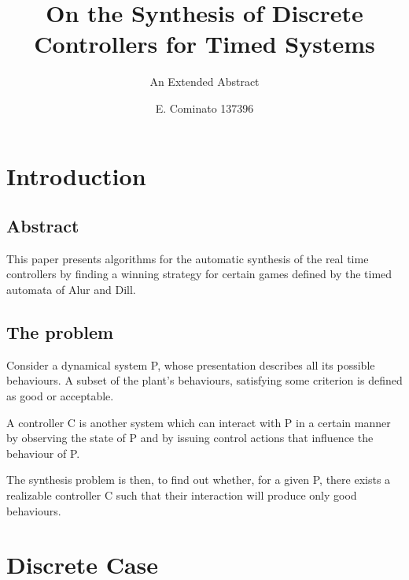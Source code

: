 \documentclass[table]{beamer}
\title[Automatic Verification] %
{On the Synthesis of Discrete Controllers for Timed Systems \cite{first_article}}
\subtitle{An Extended Abstract}
\author[Enrico] %
{E. Cominato 137396\inst{1}}
\institute %
{
	\inst{1}%
	Dipartimento di Scienze Matematiche, Informatiche e Fisiche\\
	Università degli studi di Udine
}
\date[VLC 2013] %
{}
\begin{document}
\frame{\titlepage}

\section{Introduction}
\subsection{Abstract}
\begin{frame}
This paper presents algorithms for the automatic synthesis of the real time controllers by finding a winning strategy for certain games defined by the timed automata of Alur and Dill.
\end{frame}

\subsection{The problem}
\begin{frame}
Consider a dynamical system P, whose presentation descri\-bes all its possible behaviours.
A subset of the plant's be\-hav\-iours, satisfying some criterion is defined as good or acceptable.

\medskip

A controller C is another system which can interact with P in a certain manner by observing the state of P and by issuing control actions that influence the behaviour of P.

\end{frame}

\begin{frame}
The synthesis problem is then, to find out whether, for a given P, there exists a realizable controller C
such that their interaction will produce only good behaviours.
\end{frame}

\section{Discrete Case}
\end{document}
